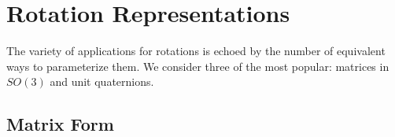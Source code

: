 
\section{Rotation Representations}

The variety of applications for rotations is echoed by the number of equivalent ways to parameterize them.  We consider three of the most popular: matrices in $SO(3)$ and unit quaternions.  

\subsection{Matrix Form}

